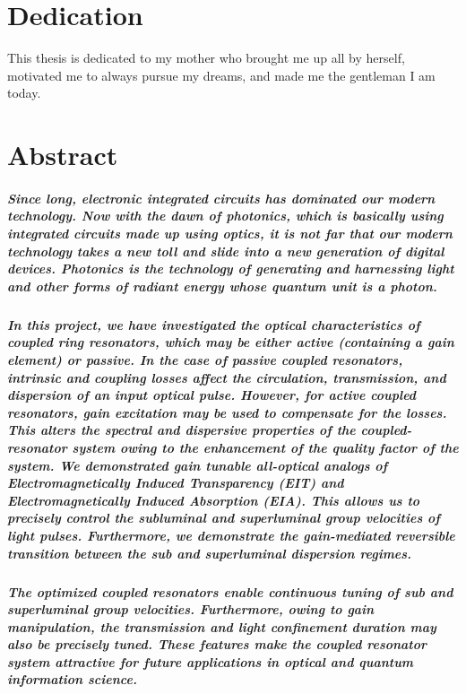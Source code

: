 \documentclass[12pt,twoside]{report}
\begin{document}
\chapter*{{\Large Dedication}}
\normalfont \large This thesis is dedicated to my mother who brought me up all by herself, motivated me to always pursue my dreams, and made me the gentleman I am today.


\chapter*{{\Large Abstract}}
\paragraph{\normalfont Since long, electronic integrated circuits has dominated our modern technology. Now with the dawn of photonics, which is basically using integrated circuits made up using optics, it is not far that our modern technology takes a new toll and slide into a new generation of digital devices. Photonics is the technology of generating and harnessing light and other forms of radiant energy whose quantum unit is a photon.}  

\paragraph{\normalfont In this project, we have investigated the optical characteristics of coupled ring resonators, which may be either active (containing a gain element) or passive. In the case of passive coupled resonators, intrinsic and coupling losses affect the circulation, transmission, and dispersion of an input optical pulse. However, for active coupled resonators, gain excitation may be used to compensate for the losses. This alters the spectral and dispersive properties of the coupled-resonator system owing to the enhancement of the quality factor of the system. We demonstrated gain tunable all-optical analogs of Electromagnetically Induced Transparency (EIT) and Electromagnetically Induced Absorption (EIA). This allows us to precisely control the subluminal and superluminal group velocities of light pulses. Furthermore, we demonstrate the gain-mediated reversible transition between the sub and superluminal dispersion regimes.}

\paragraph{\normalfont The optimized coupled resonators enable continuous tuning of sub and superluminal group velocities. Furthermore, owing to gain manipulation, the transmission and light confinement duration may also be precisely tuned. These features make the coupled resonator system attractive for future applications in optical and quantum information science.}
\end{document}
